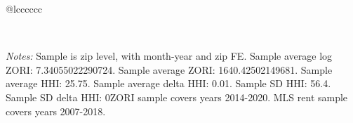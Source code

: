 \begin{table}[H]
{\begin{tabular}{@{\extracolsep{5pt}}lcccccc}
 \hline  

 \hline \\[-1.8ex]  

  {\parbox[t]{\textwidth}{ \textit{Notes:} Sample is zip level, with month-year and zip FE. Sample average log ZORI: 7.34055022290724. Sample average ZORI: 1640.42502149681. Sample average HHI: 25.75. Sample average delta HHI: 0.01. Sample SD HHI: 56.4. Sample SD delta HHI: 0ZORI sample covers years 2014-2020. MLS rent sample covers years 2007-2018.}} \\ 

 \end{tabular}}  

 \end{table}  

 



